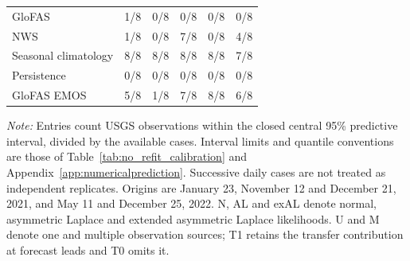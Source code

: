 \begin{table}[!htbp]
\begin{threeparttable}
\begin{tabular}{lrrrrr}
GloFAS & 1/8 & 0/8 & 0/8 & 0/8 & 0/8 \\
NWS & 1/8 & 0/8 & 7/8 & 0/8 & 4/8 \\
Seasonal climatology & 8/8 & 8/8 & 8/8 & 8/8 & 7/8 \\
Persistence & 0/8 & 0/8 & 0/8 & 0/8 & 0/8 \\
GloFAS EMOS & 5/8 & 1/8 & 7/8 & 8/8 & 6/8 \\
\hline
\end{tabular}
\begin{tablenotes}
\fontsize{8}{10}\selectfont
\item \textit{Note:} Entries count USGS observations within the closed central 95\% predictive interval, divided by the available cases. Interval limits and quantile conventions are those of Table~\ref{tab:no_refit_calibration} and Appendix~\ref{app:numericalprediction}. Successive daily cases are not treated as independent replicates. Origins are January 23, November 12 and December 21, 2021, and May 11 and December 25, 2022. N, AL and exAL denote normal, asymmetric Laplace and extended asymmetric Laplace likelihoods. U and M denote one and multiple observation sources; T1 retains the transfer contribution at forecast leads and T0 omits it.
\end{tablenotes}
\end{threeparttable}
\end{table}
